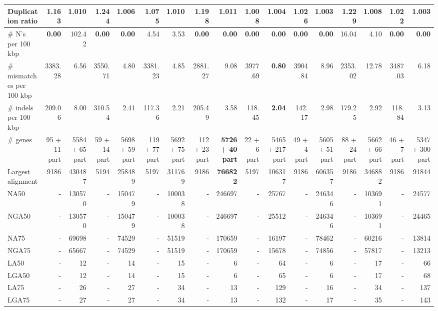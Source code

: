 \documentclass[12pt,a4paper]{article}
\begin{document}
\begin{table}[ht]
\begin{center}
\begin{tabular}{|l*{16}{|r}|}
Duplication ratio & 1.163 & 1.010 & 1.244 & 1.006 & 1.075 & 1.010 & 1.198 & 1.011 & 1.008 & 1.004 & 1.026 & {\bf 1.003} & 1.229 & 1.008 & 1.022 & {\bf 1.003} \\ \hline
\# N's per 100 kbp & {\bf 0.00} & 102.42 & {\bf 0.00} & {\bf 0.00} & 4.54 & 3.53 & {\bf 0.00} & {\bf 0.00} & {\bf 0.00} & {\bf 0.00} & {\bf 0.00} & {\bf 0.00} & 16.04 & 4.10 & {\bf 0.00} & {\bf 0.00} \\ \hline
\# mismatches per 100 kbp & 3383.28 & 6.56 & 3550.71 & 4.80 & 3381.23 & 4.85 & 2881.27 & 9.08 & 3977.69 & {\bf 0.80} & 3904.84 & 8.96 & 2353.02 & 12.78 & 3487.03 & 6.18 \\ \hline
\# indels per 100 kbp & 209.06 & 8.00 & 310.54 & 2.41 & 117.36 & 2.21 & 205.49 & 3.58 & 118.45 & {\bf 2.04} & 142.17 & 2.98 & 179.25 & 2.92 & 118.84 & 3.13 \\ \hline
\# genes & 95 + 11 part & 5584 + 65 part & 59 + 14 part & 5698 + 59 part & 119 + 77 part & 5692 + 75 part & 112 + 23 part & {\bf 5726 + 40 part} & 22 + 6 part & 5465 + 217 part & 49 + 4 part & 5605 + 51 part & 88 + 24 part & 5662 + 66 part & 46 + 7 part & 5347 + 300 part \\ \hline
Largest alignment & 9186 & 430487 & 5194 & 258489 & 5197 & 311769 & 9186 & {\bf 766822} & 5197 & 106317 & 9186 & 606357 & 9186 & 346882 & 9186 & 91844 \\ \hline
NA50 & - & 130570 & - & 150479 & - & 100038 & - & 246697 & - & 25767 & - & 246346 & - & 103691 & - & 24577 \\ \hline
NGA50 & - & 130570 & - & 150479 & - & 100038 & - & 246697 & - & 25512 & - & 246346 & - & 103691 & - & 24465 \\ \hline
NA75 & - & 69698 & - & 74529 & - & 51519 & - & 170659 & - & 16197 & - & 78462 & - & 60216 & - & 13814 \\ \hline
NGA75 & - & 65667 & - & 74529 & - & 51519 & - & 170659 & - & 15678 & - & 74856 & - & 57817 & - & 13213 \\ \hline
LA50 & - & 12 & - & 14 & - & 15 & - & 6 & - & 64 & - & 6 & - & 17 & - & 66 \\ \hline
LGA50 & - & 12 & - & 14 & - & 15 & - & 6 & - & 65 & - & 6 & - & 17 & - & 68 \\ \hline
LA75 & - & 26 & - & 27 & - & 34 & - & 13 & - & 129 & - & 16 & - & 34 & - & 137 \\ \hline
LGA75 & - & 27 & - & 27 & - & 34 & - & 13 & - & 132 & - & 17 & - & 35 & - & 143 \\ \hline
\end{tabular}
\end{center}
\end{table}
\end{document}

